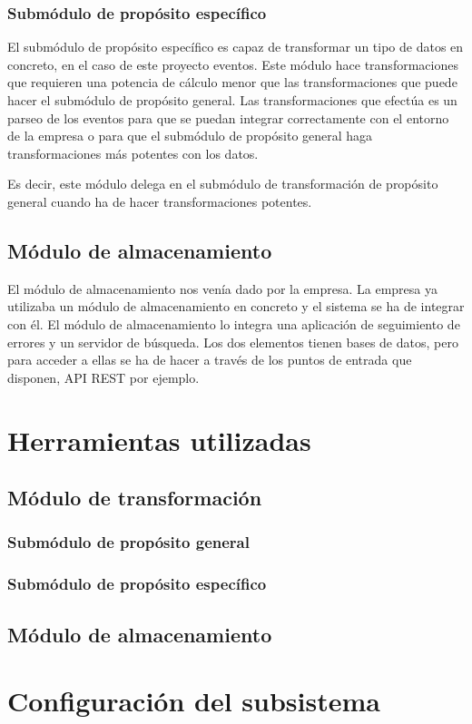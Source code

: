 \subsubsection{Submódulo de propósito específico}
El submódulo de propósito específico es capaz de transformar un tipo de datos en concreto, en el caso de este proyecto eventos. Este módulo hace transformaciones que requieren una potencia de cálculo menor que las transformaciones que puede hacer el submódulo de propósito general. Las transformaciones que efectúa es un parseo de los eventos para que se puedan integrar correctamente con el entorno de la empresa o para que el submódulo de propósito general haga transformaciones más potentes con los datos. 



Es decir, este módulo delega en el submódulo de transformación de propósito general cuando ha de hacer transformaciones potentes.

\subsection{Módulo de almacenamiento}
El módulo de almacenamiento nos venía dado por la empresa. La empresa ya utilizaba un módulo de almacenamiento en concreto y el sistema se ha de integrar con él. El módulo de almacenamiento lo integra una aplicación de seguimiento de errores y un servidor de búsqueda. Los dos elementos tienen bases de datos, pero para acceder a ellas se ha de hacer a través de los puntos de entrada que disponen, API REST por ejemplo.
\section{Herramientas utilizadas}

\subsection{Módulo de transformación}
\subsubsection{Submódulo de propósito general}
\subsubsection{Submódulo de propósito específico}
\subsection{Módulo de almacenamiento}

\section{Configuración del subsistema}


